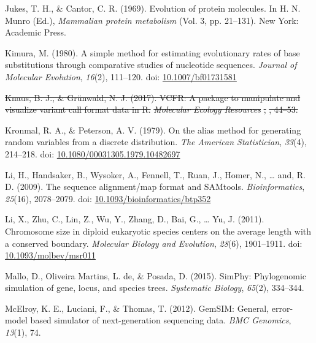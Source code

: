 \documentclass[12pt,]{article}
\providecommand{\DIFdeltex}[1]{{\protect\color{red}\sout{#1}}}                      %
\providecommand{\DIFdelbegin}{} %
\providecommand{\DIFdelend}{} %
\providecommand{\DIFdel}[1]{\texorpdfstring{\DIFdeltex{#1}}{}} %
\newcommand{\DIFscaledelfig}{0.5}
\newlength{\DIFdelgraphicswidth} %
\newlength{\DIFdelgraphicsheight} %
\newcommand{\DIFdelincludegraphics}[2][]{%
\sbox{\DIFdelgraphicsbox}{\DIFOincludegraphics[#1]{#2}}%
\settoboxwidth{\DIFdelgraphicswidth}{\DIFdelgraphicsbox} %
\settoboxtotalheight{\DIFdelgraphicsheight}{\DIFdelgraphicsbox} %
\scalebox{\DIFscaledelfig}{%
\parbox[b]{\DIFdelgraphicswidth}{\usebox{\DIFdelgraphicsbox}\\[-\baselineskip] \rule{\DIFdelgraphicswidth}{0em}}\llap{\resizebox{\DIFdelgraphicswidth}{\DIFdelgraphicsheight}{%
\setlength{\unitlength}{\DIFdelgraphicswidth}%
\begin{picture}(1,1)%
\thicklines\linethickness{2pt} %
{\color[rgb]{1,0,0}\put(0,0){\framebox(1,1){}}}%
{\color[rgb]{1,0,0}\put(0,0){\line( 1,1){1}}}%
{\color[rgb]{1,0,0}\put(0,1){\line(1,-1){1}}}%
\end{picture}%
}\hspace*{3pt}}} %
} %
\DeclareRobustCommand{\DIFdelbegin}{\DIFOdelbegin \let\includegraphics\DIFdelincludegraphics} %
\DeclareRobustCommand{\DIFdelend}{\DIFOaddend \let\includegraphics\DIFOincludegraphics} %
\begin{document}
\leavevmode\hypertarget{ref-JC69}{}%
Jukes, T. H., \& Cantor, C. R. (1969). Evolution of protein molecules. In H. N. Munro (Ed.), \emph{Mammalian protein metabolism} (Vol. 3, pp. 21--131). New York: Academic Press.

\leavevmode\hypertarget{ref-Kimura_1980}{}%
Kimura, M. (1980). A simple method for estimating evolutionary rates of base substitutions through comparative studies of nucleotide sequences. \emph{Journal of Molecular Evolution}, \emph{16}(2), 111--120. doi: \href{https://doi.org/10.1007/bf01731581}{10.1007/bf01731581}

\leavevmode\DIFdelbegin %
\DIFdel{Knaus, B. J., \& Grünwald, N. J. (2017). VCFR: A package to manipulate and visualize variant call format data in R. }\emph{\DIFdel{Molecular Ecology Resources}}%
\DIFdel{, }%
\DIFdel{, 44--53.
}%

\DIFdelend \hypertarget{ref-Kronmal_1979}{}%
Kronmal, R. A., \& Peterson, A. V. (1979). On the alias method for generating random variables from a discrete distribution. \emph{The American Statistician}, \emph{33}(4), 214--218. doi: \href{https://doi.org/10.1080/00031305.1979.10482697}{10.1080/00031305.1979.10482697}

\leavevmode\hypertarget{ref-Li_2009}{}%
Li, H., Handsaker, B., Wysoker, A., Fennell, T., Ruan, J., Homer, N., \ldots{} and, R. D. (2009). The sequence alignment/map format and SAMtools. \emph{Bioinformatics}, \emph{25}(16), 2078--2079. doi: \href{https://doi.org/10.1093/bioinformatics/btp352}{10.1093/bioinformatics/btp352}

\leavevmode\hypertarget{ref-Li_2011}{}%
Li, X., Zhu, C., Lin, Z., Wu, Y., Zhang, D., Bai, G., \ldots{} Yu, J. (2011). Chromosome size in diploid eukaryotic species centers on the average length with a conserved boundary. \emph{Molecular Biology and Evolution}, \emph{28}(6), 1901--1911. doi: \href{https://doi.org/10.1093/molbev/msr011}{10.1093/molbev/msr011}

\leavevmode\hypertarget{ref-Mallo_2015}{}%
Mallo, D., Oliveira Martins, L. de, \& Posada, D. (2015). SimPhy: Phylogenomic simulation of gene, locus, and species trees. \emph{Systematic Biology}, \emph{65}(2), 334--344.

\leavevmode\hypertarget{ref-McElroy_2012}{}%
McElroy, K. E., Luciani, F., \& Thomas, T. (2012). GemSIM: General, error-model based simulator of next-generation sequencing data. \emph{BMC Genomics}, \emph{13}(1), 74.
\end{document}
